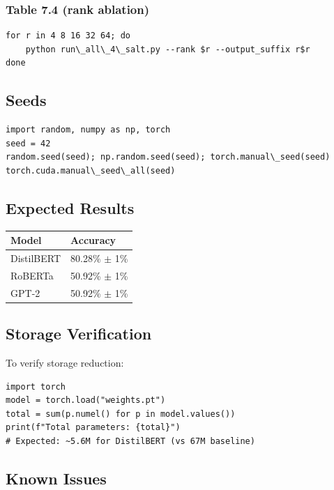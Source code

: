 \subsubsection{Table 7.4 (rank ablation)}

\begin{lstlisting}
for r in 4 8 16 32 64; do
    python run\_all\_4\_salt.py --rank $r --output_suffix r$r
done
\end{lstlisting}

\subsection{Seeds}

\begin{lstlisting}
import random, numpy as np, torch
seed = 42
random.seed(seed); np.random.seed(seed); torch.manual\_seed(seed)
torch.cuda.manual\_seed\_all(seed)
\end{lstlisting}

\subsection{Expected Results}

\begin{table}[H]
\centering
\small
\begin{tabular}{ll}
\toprule
\textbf{Model} & \textbf{Accuracy} \\
\midrule
DistilBERT & 80.28\% $\pm$ 1\% \\
RoBERTa & 50.92\% $\pm$ 1\% \\
GPT-2 & 50.92\% $\pm$ 1\% \\
\bottomrule
\end{tabular}
\end{table}

\subsection{Storage Verification}

To verify storage reduction:

\begin{lstlisting}
import torch
model = torch.load("weights.pt")
total = sum(p.numel() for p in model.values())
print(f"Total parameters: {total}")
# Expected: ~5.6M for DistilBERT (vs 67M baseline)
\end{lstlisting}

\subsection{Known Issues}


